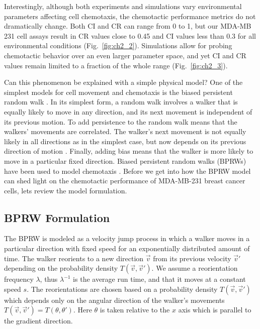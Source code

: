 Interestingly, although both experiments  and simulations vary environmental parameters affecting cell chemotaxis, the chemotactic performance metrics do not dramatically change. Both CI and CR can range from 0 to 1, but our MDA-MB 231 cell assays result in CR values close to 0.45 and CI values less than 0.3 for all environmental conditions (Fig.\ \ref{fig:ch2_2}). Simulations allow for probing chemotactic behavior over an even larger parameter space, and yet CI and CR values remain limited to a fraction of the whole range (Fig.\ \ref{fig:ch2_3}).

Can this phenomenon be explained with a simple physical model? One of the simplest models for cell movement and chemotaxis is the biased persistent random walk \cite{alt1980biased,othmer1988models}. In its simplest form, a random walk involves a walker that is equally likely to move in any direction, and its next movement is independent of its previous motion. To add persistence to the random walk means that the walkers' movements are correlated. The walker's next movement is not equally likely in all directions as in the simplest case, but now depends on its previous direction of motion \cite{patlak1953random}. Finally, adding bias means that the walker is more likely to move in a particular fixed direction.
Biased persistent random walks (BPRWs) have been used to model chemotaxis \cite{alt1980biased,othmer1988models}. Before we get into how the BPRW model can shed light on the chemotactic performance of MDA-MB-231 breast cancer cells, lets review the model formulation.

\subsection{BPRW Formulation}

The BPRW is modeled as a velocity jump process in which a walker moves in a particular direction with fixed speed for an exponentially distributed amount of time. The walker reorients to a new direction $\vec{v}$ from its previous velocity $\vec{v}'$ depending on the probability density $T(\vec{v},\vec{v}')$. We assume a reorientation frequency $\lambda$, thus $\lambda^{-1}$ is the average run time, and that it moves at a constant speed $s$. The reorientations are chosen based on a probability density $T(\vec{v},\vec{v}')$ which depends only on the angular direction of the walker's movements $T(\vec{v},\vec{v}') = T(\theta,\theta')$. Here $\theta$ is taken relative to the $x$ axis which is parallel to the gradient direction.

